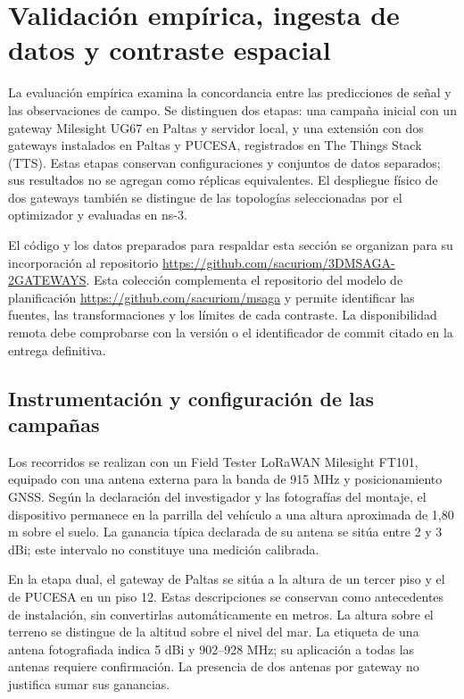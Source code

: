 \section{Validación empírica, ingesta de datos y contraste espacial}
\label{sec:Cap3.7}

La evaluación empírica examina la concordancia entre las predicciones de señal y las observaciones de campo. Se distinguen dos etapas: una campaña inicial con un gateway Milesight UG67 en Paltas y servidor local, y una extensión con dos gateways instalados en Paltas y PUCESA, registrados en The Things Stack (TTS). Estas etapas conservan configuraciones y conjuntos de datos separados; sus resultados no se agregan como réplicas equivalentes. El despliegue físico de dos gateways también se distingue de las topologías seleccionadas por el optimizador y evaluadas en ns-3.

El código y los datos preparados para respaldar esta sección se organizan para su incorporación al repositorio \url{https://github.com/sacuriom/3DMSAGA-2GATEWAYS}. Esta colección complementa el repositorio del modelo de planificación \url{https://github.com/sacuriom/msaga} y permite identificar las fuentes, las transformaciones y los límites de cada contraste. La disponibilidad remota debe comprobarse con la versión o el identificador de commit citado en la entrega definitiva.

\subsection{Instrumentación y configuración de las campañas}

Los recorridos se realizan con un Field Tester LoRaWAN Milesight FT101, equipado con una antena externa para la banda de 915 MHz y posicionamiento GNSS. Según la declaración del investigador y las fotografías del montaje, el dispositivo permanece en la parrilla del vehículo a una altura aproximada de 1,80 m sobre el suelo. La ganancia típica declarada de su antena se sitúa entre 2 y 3 dBi; este intervalo no constituye una medición calibrada.

En la etapa dual, el gateway de Paltas se sitúa a la altura de un tercer piso y el de PUCESA en un piso 12. Estas descripciones se conservan como antecedentes de instalación, sin convertirlas automáticamente en metros. La altura sobre el terreno se distingue de la altitud sobre el nivel del mar. La etiqueta de una antena fotografiada indica 5 dBi y 902--928 MHz; su aplicación a todas las antenas requiere confirmación. La presencia de dos antenas por gateway no justifica sumar sus ganancias.

